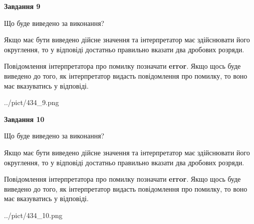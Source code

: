 \documentclass[12pt, ukrainian]{article}
\begin{document}
{\begin {Large}
{\begin {center}\textbf{Завдання 9}\end {center}}\par
Що буде виведено за виконання? \par

Якщо має бути виведено дійсне значення та інтерпретатор має здійснювати його округлення, 
то у відповіді достатньо правильно вказати два дробових розряди.

Повідомлення інтерпретатора про помилку позначати \textbf{error}.
Якщо щось буде виведено до того, як інтерпретатор видасть повідомлення про помилку, 
то воно має вказуватись у відповіді. \par

\begin{center}
	{../pict/434_9.png}
\end{center}
\newpage

{\begin {center}\textbf{Завдання 10}\end {center}}\par
Що буде виведено за виконання? \par

Якщо має бути виведено дійсне значення та інтерпретатор має здійснювати його округлення, 
то у відповіді достатньо правильно вказати два дробових розряди.

Повідомлення інтерпретатора про помилку позначати \textbf{error}.
Якщо щось буде виведено до того, як інтерпретатор видасть повідомлення про помилку, 
то воно має вказуватись у відповіді. \par

\begin{center}
	{../pict/434_10.png}
\end{center}
\newpage

\end {Large}}
\end{document}
